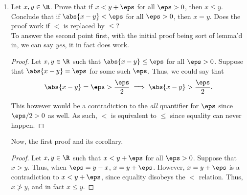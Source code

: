 \documentclass{article}
\begin{document}
\begin{enumerate}
\begin{proof}[Value of $\sup(-A)$]
          However, $\beta$ is then not a possible upper bound since for any $\eps > 0$, $\gamma + \eps > a$ for some $a \in A$.
          Following this, $-\gamma - \eps < a$ for some $a \in -A$ and thus choosing $\eps = -\gamma - \beta$:
          \begin{equation*}
            \beta = -\gamma - \eps < a.
          \end{equation*}

          However, $\beta < a$ means that $\beta$ is \textit{not} an upper bound on $-A$, and
          therefore we can conclude that $-\gamma$ is an upper bound and in fact the least upper bound, meaning $\beta \ge -\gamma$,
          and then that $\sup(-A) = -\inf(A)$.
        \end{proof}

  \item Let $x, y \in \R$. Prove that if $x < y + \eps$ for all $\eps > 0$, then $x \le y$.
        Conclude that if $\abs{x - y} < \eps$ for all $\eps > 0$, then $x = y$. Does the proof work if $<$ is replaced by $\le$?\\

        To answer the second point first, with the initial proof being sort of lemma'd in, we can say \textit{yes}, it in fact does work.
        \begin{proof}
          Let $x, y \in \R$ such that $\abs{x - y} \le \eps$ for all $\eps > 0$. Suppose that $\abs{x - y} = \eps$ for some such $\eps$.
          Thus, we could say that
          \begin{equation*}
            \abs{x - y} = \eps > \frac{\eps}{2} \implies \abs{x - y} > \frac{\eps}{2}.
          \end{equation*}

          This however would be a contradiction to the \textit{all} quantifier for $\eps$ since $\eps/2 > 0$ as well.
          As such, $<$ is equivalent to $\le$ since equality can never happen.
        \end{proof}

        Now, the first proof and its corollary.
        \begin{proof}
          Let $x, y \in \R$ such that $x < y + \eps$ for all $\eps > 0$.
          Suppose that $x > y$.
          Thus, when $\eps = y - x$, $x = y + \eps$. However, $x = y + \eps$ is a contradiction to $x < y + \eps$,
          since equality disobeys the $<$ relation.
          Thus, $x \not> y$, and in fact $x \le y$.
        \end{proof}


\end{enumerate}
\end{document}
